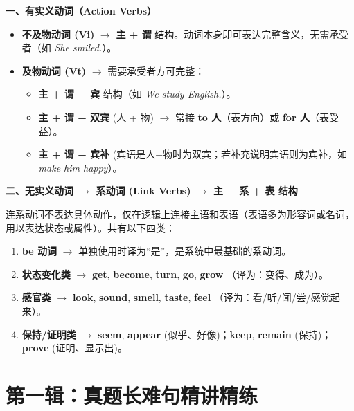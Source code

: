 \documentclass[cn,normal,11pt]{elegantnote}
\begin{document}
\begin{proposition}[谓语分类大纲与系动词条件]
  \textbf{一、有实义动词（Action Verbs）}
  \begin{itemize}
    \item \textbf{不及物动词 (Vi)} $\rightarrow$ \textbf{主 + 谓} 结构。动词本身即可表达完整含义，无需承受者（如 \textit{She smiled.}）。
    \item \textbf{及物动词 (Vt)} $\rightarrow$ 需要承受者方可完整：
      \begin{itemize}
        \item \textbf{主 + 谓 + 宾} 结构（如 \textit{We study English.}）。
        \item \textbf{主 + 谓 + 双宾} (人 + 物) $\rightarrow$ 常接 \textbf{to 人}（表方向）或 \textbf{for 人}（表受益）。
        \item \textbf{主 + 谓 + 宾补} (宾语是人+物时为双宾；若补充说明宾语则为宾补，如 \textit{make him happy}）。
      \end{itemize}
  \end{itemize}
  
  \textbf{二、无实义动词 $\rightarrow$ 系动词 (Link Verbs) $\rightarrow$ 主 + 系 + 表 结构}
  
  连系动词不表达具体动作，仅在逻辑上连接主语和表语（表语多为形容词或名词，用以表达状态或属性）。共有以下四类：
  \begin{enumerate}
    \item \textbf{be 动词} $\rightarrow$ 单独使用时译为“是”，是系统中最基础的系动词。
    \item \textbf{状态变化类} $\rightarrow$ \textbf{get}, \textbf{become}, \textbf{turn}, \textbf{go}, \textbf{grow} （译为：变得、成为）。
    \item \textbf{感官类} $\rightarrow$ \textbf{look}, \textbf{sound}, \textbf{smell}, \textbf{taste}, \textbf{feel} （译为：看/听/闻/尝/感觉起来）。
    \item \textbf{保持/证明类} $\rightarrow$ \textbf{seem}, \textbf{appear} (似乎、好像)；\textbf{keep}, \textbf{remain} (保持)；\textbf{prove} (证明、显示出)。
  \end{enumerate}
\end{proposition}

\section{第一辑：真题长难句精讲精练}
\end{document}
